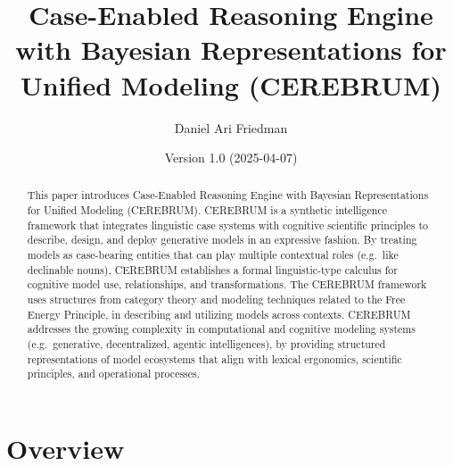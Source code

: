 \documentclass[
  11pt,
  letterpaper,
]{article}
\title{Case-Enabled Reasoning Engine with Bayesian Representations for
Unified Modeling (CEREBRUM)}
\author{Daniel Ari Friedman}
\date{Version 1.0 (2025-04-07)}
\begin{document}
\maketitle
\begin{abstract}
This paper introduces Case-Enabled Reasoning Engine with Bayesian
Representations for Unified Modeling (CEREBRUM). CEREBRUM is a synthetic
intelligence framework that integrates linguistic case systems with
cognitive scientific principles to describe, design, and deploy
generative models in an expressive fashion. By treating models as
case-bearing entities that can play multiple contextual roles (e.g.~like
declinable nouns), CEREBRUM establishes a formal linguistic-type
calculus for cognitive model use, relationships, and transformations.
The CEREBRUM framework uses structures from category theory and modeling
techniques related to the Free Energy Principle, in describing and
utilizing models across contexts. CEREBRUM addresses the growing
complexity in computational and cognitive modeling systems
(e.g.~generative, decentralized, agentic intelligences), by providing
structured representations of model ecosystems that align with lexical
ergonomics, scientific principles, and operational processes.
\end{abstract}

{
\hypersetup{linkcolor=}
\setcounter{tocdepth}{2}
\tableofcontents
}
\hypertarget{overview}{%
\section{Overview}\label{overview}}
\end{document}
